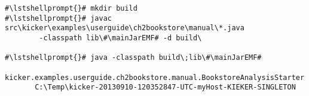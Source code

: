 \begin{lstlisting}[caption=Commands to compile and run the analysis under Windows,label=lst:bookstoreAnalysisStarterWin]
#\lstshellprompt{}# mkdir build
#\lstshellprompt{}# javac src\kicker\examples\userguide\ch2bookstore\manual\*.java 
        -classpath lib\#\mainJarEMF# -d build\

#\lstshellprompt{}# java -classpath build\;lib\#\mainJarEMF#
       kicker.examples.userguide.ch2bookstore.manual.BookstoreAnalysisStarter 
       C:\Temp\kicker-20130910-120352847-UTC-myHost-KIEKER-SINGLETON
\end{lstlisting}	

